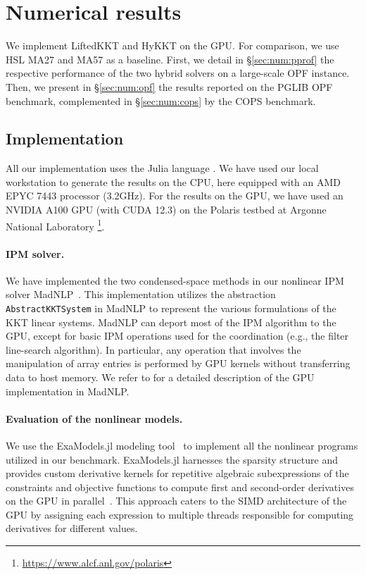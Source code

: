 \section{Numerical results}
We implement LiftedKKT and HyKKT on the GPU. For comparison,
we use HSL MA27 and MA57 as a baseline.
First, we detail in \S\ref{sec:num:pprof} the respective performance of the two hybrid solvers
on a large-scale OPF instance. Then, we present in \S\ref{sec:num:opf}
the results reported on the PGLIB OPF benchmark, complemented in \S\ref{sec:num:cops} by
the COPS benchmark.

\subsection{Implementation}
All our implementation uses the Julia language \cite{bezanson-edelman-karpinski-shah-2017}.
We have used our local workstation to generate the results on the CPU, here equipped
with an AMD EPYC 7443 processor (3.2GHz).
For the results on the GPU, we have used an NVIDIA A100 GPU (with CUDA 12.3) on
the Polaris testbed at Argonne National Laboratory
\footnote{\url{https://www.alcf.anl.gov/polaris}}.

\paragraph{IPM solver.}
We have implemented the two condensed-space methods in our nonlinear IPM solver MadNLP~\cite{shin2021graph}.
This implementation utilizes the abstraction {\tt AbstractKKTSystem}
in MadNLP to represent the various formulations of the KKT linear systems.
MadNLP can deport most of the IPM algorithm to the GPU, except for basic IPM operations used for the coordination (e.g., the filter line-search algorithm).
In particular, any operation that involves the manipulation of array entries is performed by GPU kernels without transferring data to host memory.
We refer to \cite{shin2023accelerating} for a detailed description of the GPU implementation in MadNLP.

\paragraph{Evaluation of the nonlinear models.}
We use the ExaModels.jl modeling tool~\cite{shin2023accelerating} to implement all the nonlinear programs utilized in our benchmark.
ExaModels.jl harnesses the sparsity structure and provides custom derivative kernels for repetitive algebraic subexpressions of the constraints and objective functions to compute first and second-order derivatives on the GPU in parallel~\cite{bischof1991exploiting,enzyme2021}.
This approach caters to the SIMD architecture of the GPU by assigning each expression to multiple threads responsible for computing derivatives for different values.

